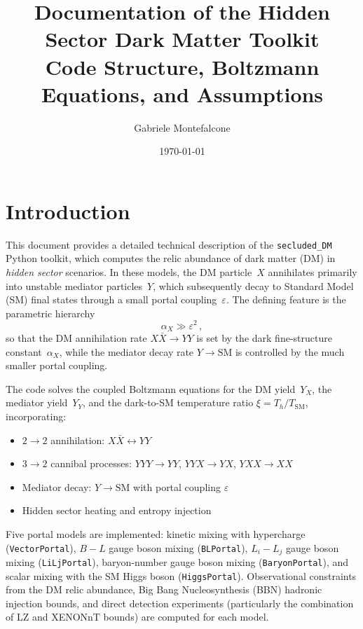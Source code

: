 \documentclass[11pt]{article}
\title{%
Documentation of the Hidden Sector Dark Matter Toolkit\\[0.5em]
\large Code Structure, Boltzmann Equations, and Assumptions
}
\author{Gabriele Montefalcone}
\date{\today}
\numberwithin{equation}{section}
\newcommand{\TD}{T_h}
\newcommand{\TSM}{T_{\text{SM}}}
\newcommand{\alphaX}{\alpha_X}
\newcommand{\epsX}{\varepsilon}
\begin{document}
\maketitle

\section{Introduction}
\label{sec:intro}

This document provides a detailed technical description of the \texttt{secluded\_DM} Python toolkit, which computes the relic abundance of dark matter (DM) in \emph{hidden sector} scenarios. In these models, the DM particle~$X$ annihilates primarily into unstable mediator particles~$Y$, which subsequently decay to Standard Model (SM) final states through a small portal coupling~$\epsX$. The defining feature is the parametric hierarchy
\begin{equation}
    \alpha_X \gg \epsX^2\,,
\end{equation}
so that the DM annihilation rate $X\bar{X}\to YY$ is set by the dark fine-structure constant~$\alphaX$, while the mediator decay rate $Y\to \text{SM}$ is controlled by the much smaller portal coupling.

The code solves the coupled Boltzmann equations for the DM yield~$Y_X$, the mediator yield~$Y_Y$, and the dark-to-SM temperature ratio $\xi = \TD / \TSM$, incorporating:
\begin{itemize}
    \item $2\to2$ annihilation: $X\bar{X} \leftrightarrow YY$
    \item $3\to2$ cannibal processes: $YYY\to YY$, $YYX\to YX$, $YXX\to XX$
    \item Mediator decay: $Y\to\text{SM}$ with portal coupling $\epsX$
    \item Hidden sector heating and entropy injection
\end{itemize}

Five portal models are implemented: kinetic mixing with hypercharge (\texttt{VectorPortal}), $B-L$ gauge boson mixing (\texttt{BLPortal}), $L_i - L_j$ gauge boson mixing (\texttt{LiLjPortal}), baryon-number gauge boson mixing (\texttt{BaryonPortal}), and scalar mixing with the SM Higgs boson (\texttt{HiggsPortal}). Observational constraints from the DM relic abundance, Big Bang Nucleosynthesis (BBN) hadronic injection bounds, and direct detection experiments (particularly the combination of LZ and XENONnT bounds) are computed for each model.
\end{document}
